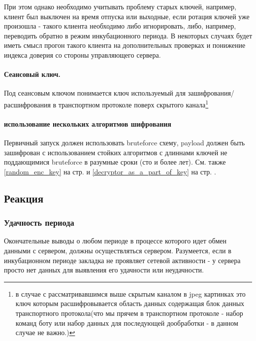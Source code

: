 При этом однако необходимо учитывать проблему старых ключей, например, клиент был выключен
на время отпуска или выходные, если ротация ключей уже произошла - такого клиента необходимо
 либо игнорировать, либо, например, переводить обратно в режим инкубационного периода. В
некоторых случаях будет иметь смысл прогон такого клиента на дополнительных проверках и понижение
индекса доверия со стороны управляющего сервера.

\paragraph{Сеансовый ключ.\\}

Под сеансовым ключом понимается ключ используемый для
зашифрования/расшифрования в транспортном протоколе поверх скрытого
канала\footnote{в случае с рассматривавшимся выше скрытым каналом в jpeg
картинках это ключ которым расшифровывается область данных содержащая
блок данных транспортного протокола(что мы прячем в транспортном
протоколе - набор команд боту или набор данных для последующей
дообработки - в данном случае не важно.)}

\paragraph{использование нескольких алгоритмов шифрования\\}
Первичный запуск должен использовать bruteforce схему, payload должен быть зашифрован с использованием стойких алгоритмов с длиннами ключей не поддающимися bruteforce в
разумные сроки (сто и более лет). См. также \ref{random_enc_key} на стр.
 \pageref{random_enc_key} и \ref{decryptor_as_a_part_of_key} на стр. \pageref{decryptor_as_a_part_of_key}.

\subsection{Реакция}
\subsubsection{Удачность периода}

Окончательные выводы о любом периоде в процессе которого идет обмен
данными с сервером, должны осуществляться сервером.
Разумеется, если в инкубационном периоде закладка не проявляет
 сетевой активности -  у сервера просто нет данных для выявления
 его  удачности или неудачности.

